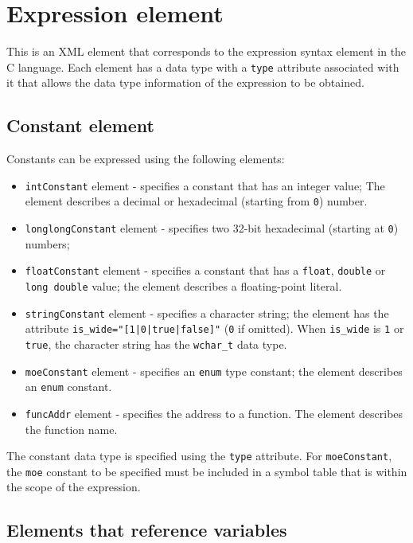\section{Expression element}

This is an XML element that corresponds to the expression syntax element in the C language. Each element has a data type with a {\tt type} attribute associated with it that allows the data type information of the expression to be obtained.


\subsection{Constant element}

Constants can be expressed using the following elements:

\begin{itemize}
\item {\tt intConstant} element - specifies a constant that has an integer value;
      The element describes a decimal or hexadecimal (starting from {\tt 0}) number.
\item {\tt longlongConstant} element - specifies two 32-bit hexadecimal (starting at {\tt 0}) numbers;
\item {\tt floatConstant} element - specifies a constant that has a {\tt float}, {\tt double} or {\tt long double} value; 
      the element describes a floating-point literal.
\item {\tt stringConstant} element - specifies a character string;
      the element has the attribute {\tt is\_wide="[1|0|true|false]"} ({\tt 0} if omitted). When {\tt is\_wide} is {\tt 1} or {\tt true}, the character string has the {\tt wchar\_t} data type.
\item {\tt moeConstant} element - specifies an {\tt enum} type constant;
      the element describes an {\tt enum} constant.
\item {\tt funcAddr} element - specifies the address to a function.
      The element describes the function name.
\end{itemize}

The constant data type is specified using the {\tt type} attribute.
For {\tt moeConstant}, the {\tt moe} constant to be specified must be included in a symbol table that is within the scope of the expression.


\subsection{Elements that reference variables}

